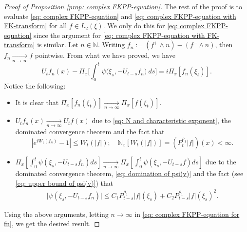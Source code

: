 \documentclass[12pt,a4paper]{amsart}
\theoremstyle{plain}
\theoremstyle{definition}
\numberwithin{equation}{section}
\begin{document}
\begin{proof}[Proof of Proposition \ref{prop: complex FKPP-equation}]
    The rest of the proof is to evaluate \eqref{eq: complex FKPP-equation} and \eqref{eq: complex FKPP-equation with FK-transform} for all $f\in L_2(\xi)$. We only do this for \eqref{eq: complex FKPP-equation} since the argument for \eqref{eq: complex FKPP-equation with FK-transform} is similar.
    Let $n \in \mathbb N$.
    Writing $f_n := (f^+ \wedge n) - (f^- \wedge n)$, then $f_n \xrightarrow[n\to \infty]{} f$ pointwise.
    From what we have proved, we have
\begin{equation}
\label{eq: complex FKPP-equation for fn}
    U_tf_n(x) - \Pi_{x} \Big[\int_0^t \psi\big(\xi_s, - U_{t-s}f_n\big) ~ds\Big]
    = i \Pi_{x} [f_n(\xi_t)].
\end{equation}
    Notice the following:
\begin{itemize}
\item
    It is clear that $\Pi_{x}[f_n(\xi_t)] \xrightarrow[n\to \infty]{} \Pi_{x}[f(\xi_t)]$.
\item
     $U_tf_n(x) \xrightarrow[n\to \infty]{} U_tf(x)$ due to \eqref{eq: N and characteristic exponent}, the dominated convergence theorem and the fact that
\[
    |e^{i W_t(f_n)} - 1| \leq W_t(|f|);
    \quad \mathbb N_x[W_t(|f|)] = (P_t^{\rho_1} |f|)(x) < \infty.
\]
\item
     $\Pi_{x} [\int_0^t \psi(\xi_s,- U_{t-s}f_n)ds] \xrightarrow[n\to \infty]{} \Pi_{x} [\int_0^t \psi(\xi_s,- U_{t-s}f)ds]$ due to the dominated convergence theorem, \eqref{eq: domination of psi(v)} and the fact (see \eqref{eq: upper bound of psi(v)}) that
\begin{equation}\begin{split}
    \big|\psi(\xi_s,- U_{t-s}f_n)\big|
    \leq C_1 P_{t-s}^{\rho_1}|f|(\xi_s)+C_2 P_{t-s}^{\rho_1}|f|(\xi_s)^2.
\end{split}\end{equation}
\end{itemize}
    Using the above arguments, letting $n \to \infty$ in \eqref{eq: complex FKPP-equation for fn}, we get the desired result.
\end{proof}
\end{document}
